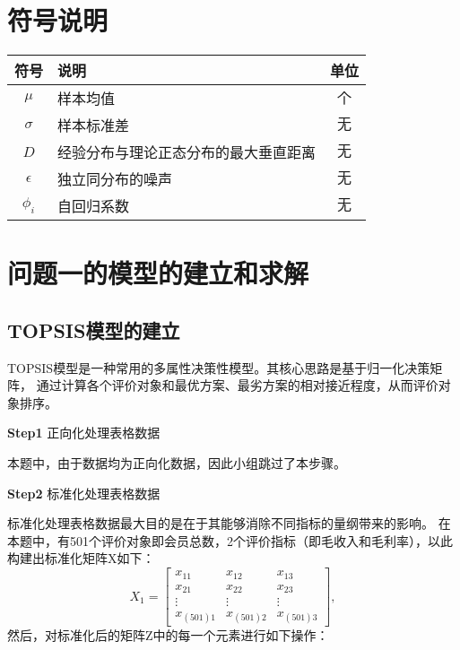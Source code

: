 \documentclass[withoutpreface,bwprint]{cumcmthesis}
\begin{document}

\section{符号说明}
\begin{table}[H]
\centering
\begin{tabularx}{\textwidth}{CLC}
\toprule
符号    & 说明    & 单位 \\
\midrule
$\mu    $& 样本均值 & $\text{个}$ \\
$\sigma     $& 样本标准差 & $\text{无}$ \\
$D    $& 经验分布与理论正态分布的最大垂直距离 & $\text{无}$ \\
$\epsilon    $& 独立同分布的噪声 & $\text{无}$ \\
$\phi_i    $& 自回归系数 & $\text{无}$ \\

\bottomrule
\end{tabularx}
\label{tab:符号说明}
\end{table}



\section{问题一的模型的建立和求解}
\subsection{TOPSIS模型的建立}
TOPSIS模型是一种常用的多属性决策性模型。其核心思路是基于归一化决策矩阵，
通过计算各个评价对象和最优方案、最劣方案的相对接近程度，从而评价对象排序。
\par
\textbf{Step1} 正向化处理表格数据
\par
本题中，由于数据均为正向化数据，因此小组跳过了本步骤。

\par
\textbf{Step2} 标准化处理表格数据
\par
标准化处理表格数据最大目的是在于其能够消除不同指标的量纲带来的影响。
在本题中，有501个评价对象即会员总数，2个评价指标（即毛收入和毛利率），以此构建出标准化矩阵X如下：
\begin{equation}
\label{eq:公式1}
X_1=
\begin{bmatrix}
x_{11} & x_{12} & x_{13} \\
x_{21} & x_{22} & x_{23} \\
\vdots & \vdots & \vdots \\
x_{(501)1} & x_{(501)2} & x_{(501)3}
\end{bmatrix},
\end{equation}
然后，对标准化后的矩阵Z中的每一个元素进行如下操作：
\end{document}
